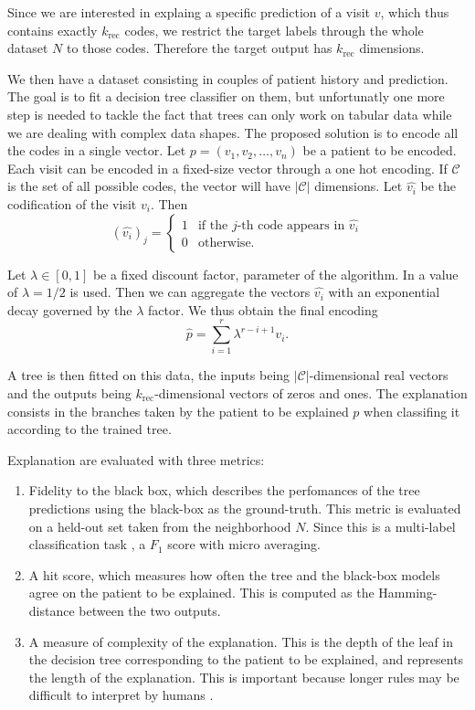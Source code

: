 \documentclass[]{marticle}
\newcommand{\codes}{\mathcal{C}}
\begin{document}
Since we are interested in explaing a specific prediction of a visit $v$, which thus contains
exactly $k_\text{rec}$ codes, we restrict the target labels through the whole dataset $N$ to those
codes. Therefore the target output has $k_\text{rec}$ dimensions.

We then have a dataset consisting in couples of patient history and prediction. The goal is to fit a
decision tree classifier on them, but unfortunatly one more step is needed to tackle the fact that
trees can only work on tabular data while we are dealing with complex data shapes. The proposed
solution is to encode all the codes in a single vector. Let $p=(v_1, v_2, \dots, v_n)$ be a patient
to be encoded. Each visit can be encoded in a fixed-size vector through a one hot encoding. If
$\codes$ is the set of all possible codes, the vector will have $|\codes|$ dimensions. Let
$\hat{v_i}$ be the codification of the visit $v_i$. Then
\begin{equation*}
    (\hat{v_i})_j = \begin{cases}
        1 &\text{if the $j$-th code appears in $\hat{v_i}$}  \\
        0 &\text{otherwise}.
    \end{cases}
\end{equation*}

Let $\lambda\in [0,1]$ be a fixed discount factor, parameter of the algorithm. In
\cite{panigutti-xai} a value of $\lambda = 1/2$ is used. Then we can aggregate the vectors
$\hat{v_i}$ with an exponential decay governed by the $\lambda$ factor. We thus obtain the final
encoding
\begin{equation*}
    \hat{p} = \sum_{i=1}^r \lambda^{r-i+1} v_i.
\end{equation*}

A tree is then fitted on this data, the inputs being $|\codes|$-dimensional real vectors and the
outputs being $k_\text{rec}$-dimensional vectors of zeros and ones. The explanation consists in the
branches taken by the patient to be explained $p$ when classifing it according to the trained tree.

Explanation are evaluated with three metrics:
\begin{enumerate}
\item Fidelity to the black box, which describes the perfomances of the tree predictions using the
black-box as the ground-truth. This metric is evaluated on a held-out set taken from the
neighborhood $N$. Since this is a multi-label classification task \cite{paper-multi-label}, a $F_1$
score with micro averaging.

\item A hit score, which measures how often the tree and the black-box models agree on the patient
to be explained. This is computed as the Hamming-distance between the two outputs.

\item A measure of complexity of the explanation. This is the depth of the leaf in the decision tree
corresponding to the patient to be explained, and represents the length of the explanation. This is
important because longer rules may be difficult to interpret by humans \cite{paper-lipton}.
\end{enumerate}
\end{document}
